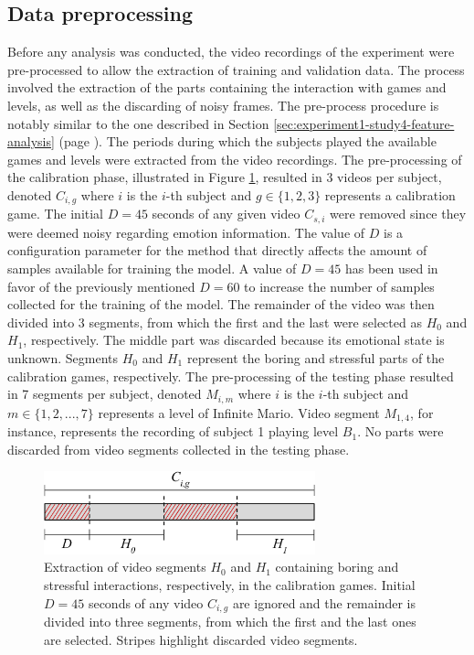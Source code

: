 \subsection{Data preprocessing}

Before any analysis was conducted, the video recordings of the experiment were pre-processed to allow the extraction of training and validation data. The process involved the extraction of the parts containing the interaction with games and levels, as well as the discarding of noisy frames. The pre-process procedure is notably similar to the one described in Section \ref{sec:experiment1-study4-feature-analysis} (page \pageref{sec:experiment1-study4-feature-analysis}). The periods during which the subjects played the available games and levels were extracted from the video recordings. The pre-processing of the calibration phase, illustrated in Figure \ref{fig:experiment2-pre-processing}, resulted in 3 videos per subject, denoted $C_{i,g}$ where $i$ is the $i$-th subject and $g \in \{1, 2, 3\}$ represents a calibration game. The initial $D=45$ seconds of any given video $C_{s,i}$ were removed since they were deemed noisy regarding emotion information. The value of $D$ is a configuration parameter for the method that directly affects the amount of samples available for training the model. A value of $D=45$ has been used in favor of the previously mentioned $D=60$ to increase the number of samples collected for the training of the model. The remainder of the video was then divided into 3 segments, from which the first and the last were selected as $H_0$ and $H_1$, respectively. The middle part was discarded because its emotional state is unknown. Segments $H_0$ and $H_1$ represent the boring and stressful parts of the calibration games, respectively. The pre-processing of the testing phase resulted in 7 segments per subject, denoted $M_{i,m}$ where $i$ is the $i$-th subject and $m \in \{1, 2, ..., 7\}$ represents a level of Infinite Mario. Video segment $M_{1,4}$, for instance, represents the recording of subject 1 playing level $B_1$. No parts were discarded from video segments collected in the testing phase.

\begin{figure}[h]
    \centering
    \includegraphics[width=0.7\textwidth]{Content/figures/experiment2-pre-processing}
    \caption{Extraction of video segments $H_0$ and $H_1$ containing boring and stressful interactions, respectively, in the calibration games. Initial $D=45$ seconds of any video $C_{i,g}$ are ignored and the remainder is divided into three segments, from which the first and the last ones are selected. Stripes highlight discarded video segments.}
    \label{fig:experiment2-pre-processing}
\end{figure}

